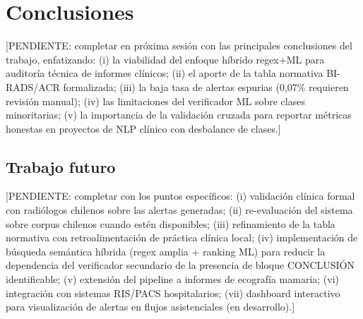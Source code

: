 \documentclass[10pt,journal,a4paper]{IEEEtran}
\begin{document}
\section{Conclusiones}
[PENDIENTE: completar en pr\'oxima sesi\'on con las principales conclusiones del trabajo, enfatizando: (i) la viabilidad del enfoque h\'ibrido regex+ML para auditor\'ia t\'ecnica de informes cl\'inicos; (ii) el aporte de la tabla normativa BI-RADS/ACR formalizada; (iii) la baja tasa de alertas espurias (0,07\% requieren revisi\'on manual); (iv) las limitaciones del verificador ML sobre clases minoritarias; (v) la importancia de la validaci\'on cruzada para reportar m\'etricas honestas en proyectos de NLP cl\'inico con desbalance de clases.]

\subsection*{Trabajo futuro}
[PENDIENTE: completar con los puntos espec\'ificos: (i) validaci\'on cl\'inica formal con radi\'ologos chilenos sobre las alertas generadas; (ii) re-evaluaci\'on del sistema sobre corpus chilenos cuando est\'en disponibles; (iii) refinamiento de la tabla normativa con retroalimentaci\'on de pr\'actica cl\'inica local; (iv) implementaci\'on de b\'usqueda sem\'antica h\'ibrida (regex amplia + ranking ML) para reducir la dependencia del verificador secundario de la presencia de bloque CONCLUSI\'ON identificable; (v) extensi\'on del pipeline a informes de ecograf\'ia mamaria; (vi) integraci\'on con sistemas RIS/PACS hospitalarios; (vii) dashboard interactivo para visualizaci\'on de alertas en flujos asistenciales (en desarrollo).]
\end{document}
